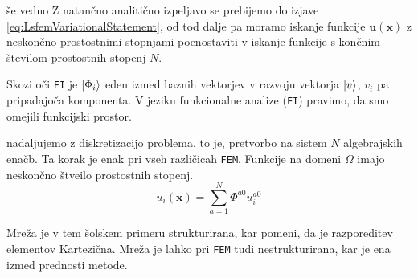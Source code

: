 še vedno  Z natančno analitično izpeljavo se prebijemo do izjave \eqref{eq:LsfemVariationalStatement}, od tod dalje pa moramo iskanje funkcije $\mathbf{u(x)}$ z neskončno prostostnimi stopnjami poenostaviti v iskanje funkcije s končnim številom prostostnih stopenj $N$. 

Skozi oči \texttt{FI} je $\ket{\Phi_i}$ eden izmed baznih vektorjev v razvoju vektorja $\ket{v}$, $v_i$ pa pripadajoča komponenta.
V jeziku funkcionalne analize (\texttt{FI}) pravimo, da smo omejili funkcijski prostor.

nadaljujemo z diskretizacijo problema, to je, pretvorbo na sistem $N$ algebrajskih enačb. Ta korak je enak pri vseh različicah \texttt{FEM}. Funkcije na domeni $\Omega$ imajo neskončno štveilo prostostnih stopenj. 
\begin{equation}
    u_i(\mathbf{x}) = \sum_{a = 1}^N \Phi^{a0} u^{a0}_i
\end{equation}

Mreža je v tem šolskem primeru strukturirana, kar pomeni, da je razporeditev elementov Kartezična. Mreža je lahko pri \texttt{FEM} tudi nestrukturirana, kar je ena izmed prednosti metode.

